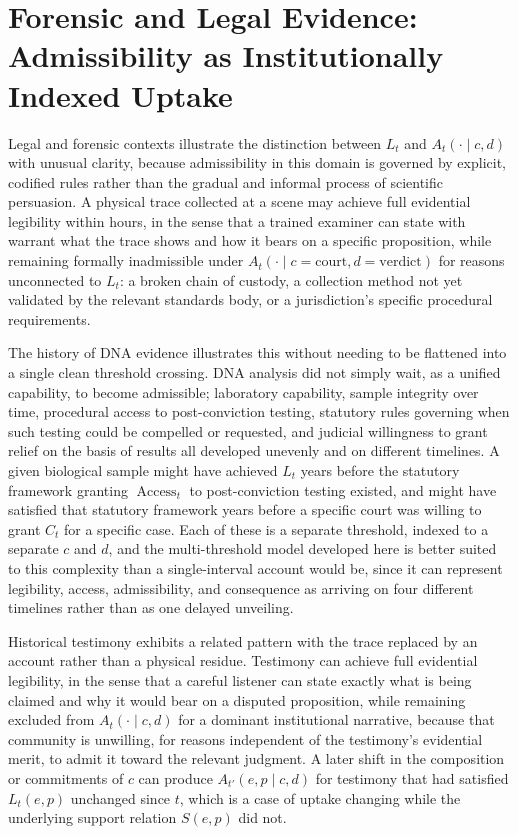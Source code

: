 \documentclass[11pt]{article}
\begin{document}
\section{Forensic and Legal Evidence: Admissibility as Institutionally Indexed Uptake}

Legal and forensic contexts illustrate the distinction between $L_t$ and $A_t(\cdot \mid c, d)$ with unusual clarity, because admissibility in this domain is governed by explicit, codified rules rather than the gradual and informal process of scientific persuasion. A physical trace collected at a scene may achieve full evidential legibility within hours, in the sense that a trained examiner can state with warrant what the trace shows and how it bears on a specific proposition, while remaining formally inadmissible under $A_t(\cdot \mid c=\text{court}, d=\text{verdict})$ for reasons unconnected to $L_t$: a broken chain of custody, a collection method not yet validated by the relevant standards body, or a jurisdiction's specific procedural requirements.

The history of DNA evidence illustrates this without needing to be flattened into a single clean threshold crossing. DNA analysis did not simply wait, as a unified capability, to become admissible; laboratory capability, sample integrity over time, procedural access to post-conviction testing, statutory rules governing when such testing could be compelled or requested, and judicial willingness to grant relief on the basis of results all developed unevenly and on different timelines. A given biological sample might have achieved $L_t$ years before the statutory framework granting $\operatorname{Access}_t$ to post-conviction testing existed, and might have satisfied that statutory framework years before a specific court was willing to grant $C_t$ for a specific case. Each of these is a separate threshold, indexed to a separate $c$ and $d$, and the multi-threshold model developed here is better suited to this complexity than a single-interval account would be, since it can represent legibility, access, admissibility, and consequence as arriving on four different timelines rather than as one delayed unveiling.

Historical testimony exhibits a related pattern with the trace replaced by an account rather than a physical residue. Testimony can achieve full evidential legibility, in the sense that a careful listener can state exactly what is being claimed and why it would bear on a disputed proposition, while remaining excluded from $A_t(\cdot \mid c, d)$ for a dominant institutional narrative, because that community is unwilling, for reasons independent of the testimony's evidential merit, to admit it toward the relevant judgment. A later shift in the composition or commitments of $c$ can produce $A_{t'}(e,p \mid c,d)$ for testimony that had satisfied $L_t(e,p)$ unchanged since $t$, which is a case of uptake changing while the underlying support relation $S(e,p)$ did not.
\end{document}
